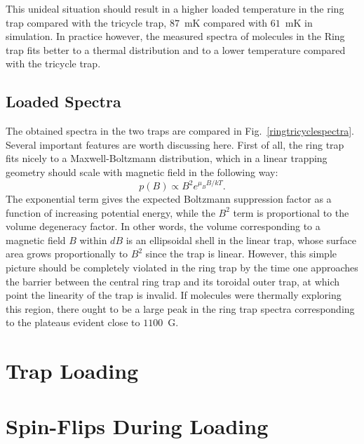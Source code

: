 \documentclass[defaultstyle,11pt]{thesis}
\begin{document}
This unideal situation should result in a higher loaded temperature in the ring trap compared with the tricycle trap, $87$~mK compared with $61$~mK in simulation.
In practice however, the measured spectra of molecules in the Ring trap fits better to a thermal distribution and to a lower temperature compared with the tricycle trap.

\subsection{Loaded Spectra}


The obtained spectra in the two traps are compared in Fig.~\ref{ringtricyclespectra}.
Several important features are worth discussing here.
First of all, the ring trap fits nicely to a Maxwell-Boltzmann distribution, which in a linear trapping geometry should scale with magnetic field in the following way:
\begin{equation}
p(B)\propto B^2e^{\mu_B B/kT}.
\end{equation}
The exponential term gives the expected Boltzmann suppression factor as a function of increasing potential energy, while the $B^2$ term is proportional to the volume degeneracy factor.
In other words, the volume corresponding to a magnetic field $B$ within $dB$ is an ellipsoidal shell in the linear trap, whose surface area grows proportionally to $B^2$ since the trap is linear.
However, this simple picture should be completely violated in the ring trap by the time one approaches the barrier between the central ring trap and its toroidal outer trap, at which point the linearity of the trap is invalid.
If molecules were thermally exploring this region, there ought to be a large peak in the ring trap spectra corresponding to the plateaus evident close to $1100$~G.




\section{Trap Loading}

\section{Spin-Flips During Loading}
\label{loadingtransitions}
\end{document}
